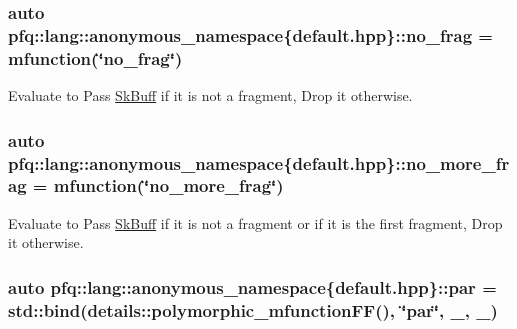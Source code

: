 \hypertarget{namespacepfq_1_1lang_1_1anonymous__namespace_02default_8hpp_03_a4cfaf018f687a1563161b8f4245a6652}{
\subsubsection[{no\+\_\+frag}]{\setlength{\rightskip}{0pt plus 5cm}auto pfq\+::lang\+::anonymous\+\_\+namespace\{default.\+hpp\}\+::no\+\_\+frag = {\bf mfunction}(\char`\"{}no\+\_\+frag\char`\"{})}}\label{namespacepfq_1_1lang_1_1anonymous__namespace_02default_8hpp_03_a4cfaf018f687a1563161b8f4245a6652}


Evaluate to {\ttfamily Pass} \hyperlink{structpfq_1_1lang_1_1SkBuff}{Sk\+Buff} if it is not a fragment, {\ttfamily Drop} it otherwise. 

\hypertarget{namespacepfq_1_1lang_1_1anonymous__namespace_02default_8hpp_03_a88628ce70e2a650af1338851373b9891}{
\subsubsection[{no\+\_\+more\+\_\+frag}]{\setlength{\rightskip}{0pt plus 5cm}auto pfq\+::lang\+::anonymous\+\_\+namespace\{default.\+hpp\}\+::no\+\_\+more\+\_\+frag = {\bf mfunction}(\char`\"{}no\+\_\+more\+\_\+frag\char`\"{})}}\label{namespacepfq_1_1lang_1_1anonymous__namespace_02default_8hpp_03_a88628ce70e2a650af1338851373b9891}


Evaluate to {\ttfamily Pass} \hyperlink{structpfq_1_1lang_1_1SkBuff}{Sk\+Buff} if it is not a fragment or if it is the first fragment, {\ttfamily Drop} it otherwise. 

\hypertarget{namespacepfq_1_1lang_1_1anonymous__namespace_02default_8hpp_03_abd0f7876a26a959f9fc211cc23599493}{
\subsubsection[{par}]{\setlength{\rightskip}{0pt plus 5cm}auto pfq\+::lang\+::anonymous\+\_\+namespace\{default.\+hpp\}\+::par = std\+::bind(details\+::polymorphic\+\_\+mfunction\+F\+F(), \char`\"{}par\char`\"{}, \+\_, \+\_)}}\label{namespacepfq_1_1lang_1_1anonymous__namespace_02default_8hpp_03_abd0f7876a26a959f9fc211cc23599493}


